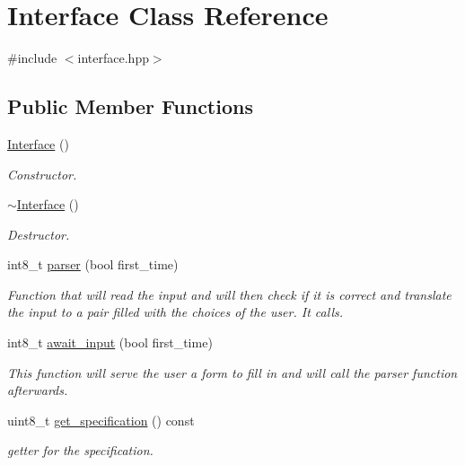 \hypertarget{class_interface}{}\section{Interface Class Reference}
\label{class_interface}


{\ttfamily \#include $<$interface.\+hpp$>$}

\subsection*{Public Member Functions}
\begin{DoxyCompactItemize}
\item 
\hyperlink{class_interface_a4406d74c75bdfe150bf72be1f1cda8b1}{Interface} ()
\begin{DoxyCompactList}\small\item\em Constructor. \end{DoxyCompactList}\item 
\hyperlink{class_interface_a19179888f29f18f1be54a3dfe98f68c0}{$\sim$\+Interface} ()
\begin{DoxyCompactList}\small\item\em Destructor. \end{DoxyCompactList}\item 
int8\+\_\+t \hyperlink{class_interface_a345faa7570aa36a31681ca850d1c283d}{parser} (bool first\+\_\+time)
\begin{DoxyCompactList}\small\item\em Function that will read the input and will then check if it is correct and translate the input to a pair filled with the choices of the user. It calls. \end{DoxyCompactList}\item 
int8\+\_\+t \hyperlink{class_interface_a24b944dc66cb79f76ba91192a2a2860e}{await\+\_\+input} (bool first\+\_\+time)
\begin{DoxyCompactList}\small\item\em This function will serve the user a form to fill in and will call the parser function afterwards. \end{DoxyCompactList}\item 
uint8\+\_\+t \hyperlink{class_interface_adfa71e85801e5bb0e8bc88da902f8133}{get\+\_\+specification} () const 
\begin{DoxyCompactList}\small\item\em getter for the specification. \end{DoxyCompactList}\end{DoxyCompactItemize}
